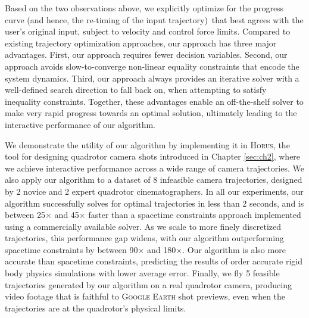 Based on the two observations above, we explicitly optimize for the progress curve (and hence, the re-timing of the input trajectory)\ that best agrees with the user's original input, subject to velocity and control force limits.
Compared to existing trajectory optimization approaches, our approach has three major advantages. First, our approach requires fewer decision variables.
Second, our approach avoids slow-to-converge non-linear equality constraints that encode the system dynamics.
Third, our approach always provides an iterative solver with a well-defined search direction to fall back on, when attempting to satisfy inequality constraints.
Together, these advantages enable an off-the-shelf solver to make very rapid progress towards an optimal solution, ultimately leading to the interactive performance of our algorithm.

We demonstrate the utility of our algorithm by implementing it in \textsc{Horus}, the tool for designing quadrotor camera shots introduced in Chapter \ref{sec:ch2}, where we achieve interactive performance across a wide range of camera trajectories.
We also apply our algorithm to a dataset of 8 infeasible camera trajectories, designed by 2 novice and 2 expert quadrotor cinematographers.
In all our experiments, our algorithm successfully solves for optimal trajectories in less than 2 seconds, and is between 25$\times$ and 45$\times$ faster than a spacetime constraints approach implemented using a commercially available solver.
As we scale to more finely discretized trajectories, this performance gap widens, with our algorithm outperforming spacetime constraints by between 90$\times$ and 180$\times$.
Our algorithm is also more accurate than spacetime constraints, predicting the results of  order accurate rigid body physics simulations with lower average error.
Finally, we fly 5 feasible trajectories generated by our algorithm on a real quadrotor camera, producing video footage that is faithful to \textsc{Google Earth} shot previews, even when the trajectories are at the quadrotor's physical limits.
